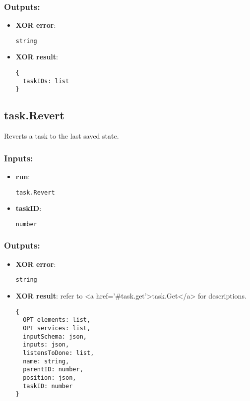 \subsubsection*{Outputs:}
\begin{itemize}
    \item \textbf{XOR error}: 
\begin{lstlisting}
string
\end{lstlisting}
    \item \textbf{XOR result}: 
\begin{lstlisting}
{
  taskIDs: list
}
\end{lstlisting}
  \end{itemize}

\subsection{task.Revert}
\label{ch:builtinservices:task.Revert}
Reverts a task to the last saved state.
\subsubsection*{Inputs:}
\begin{itemize}
    \item \textbf{run}: 
\begin{lstlisting}
task.Revert
\end{lstlisting}
    \item \textbf{taskID}: 
\begin{lstlisting}
number
\end{lstlisting}
  \end{itemize}

\subsubsection*{Outputs:}
\begin{itemize}
    \item \textbf{XOR error}: 
\begin{lstlisting}
string
\end{lstlisting}
    \item \textbf{XOR result}: refer to <a href='\#task.get'>task.Get</a> for descriptions.
\begin{lstlisting}
{
  OPT elements: list, 
  OPT services: list, 
  inputSchema: json, 
  inputs: json, 
  listensToDone: list, 
  name: string, 
  parentID: number, 
  position: json, 
  taskID: number
}
\end{lstlisting}
  \end{itemize}

